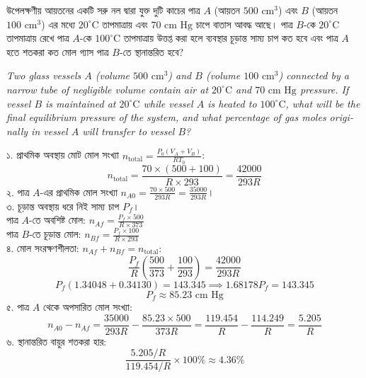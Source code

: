 \documentclass[12pt, a4paper]{article}
\begin{document}
\vspace{1.5em}

\begin{tcolorbox}[questionbox={প্রশ্ন (Question) 3}]
\noindent
উপেলক্ষণীয় আয়তনের একটি সরু নল দ্বারা যুক্ত দুটি কাচের পাত্র $A$ (আয়তন $500\text{ cm}^3$) এবং $B$ (আয়তন $100\text{ cm}^3$) এর মধ্যে $20^\circ\text{C}$ তাপমাত্রায় এবং $70\text{ cm Hg}$ চাপে বাতাস আবদ্ধ আছে। পাত্র $B$-কে $20^\circ\text{C}$ তাপমাত্রায় রেখে পাত্র $A$-কে $100^\circ\text{C}$ তাপমাত্রায় উত্তপ্ত করা হলে ব্যবস্থার চূড়ান্ত সাম্য চাপ কত হবে এবং পাত্র $A$ হতে শতকরা কত মোল গ্যাস পাত্র $B$-তে স্থানান্তরিত হবে?

\vspace{0.8em}
\begin{english}
\noindent\textit{\color{darkgray}
Two glass vessels $A$ (volume $500\text{ cm}^3$) and $B$ (volume $100\text{ cm}^3$) connected by a narrow tube of negligible volume contain air at $20^\circ\text{C}$ and $70\text{ cm Hg}$ pressure. If vessel $B$ is maintained at $20^\circ\text{C}$ while vessel $A$ is heated to $100^\circ\text{C}$, what will be the final equilibrium pressure of the system, and what percentage of gas moles originally in vessel $A$ will transfer to vessel $B$?
}
\end{english}
\end{tcolorbox}

\vspace{1em}

\begin{tcolorbox}[solutionbox={সমাধান (Solution)}]
\noindent
১. প্রাথমিক অবস্থায় মোট মোল সংখ্যা $n_{\text{total}} = \frac{P_0 (V_A + V_B)}{R T_0}$:
\[ n_{\text{total}} = \frac{70 \times (500 + 100)}{R \times 293} = \frac{42000}{293 R} \]
২. পাত্র $A$-এর প্রাথমিক মোল সংখ্যা $n_{A0} = \frac{70 \times 500}{293 R} = \frac{35000}{293 R}$। \\
৩. চূড়ান্ত অবস্থায় ধরে নিই সাম্য চাপ $P_f$। \\
পাত্র $A$-তে অবশিষ্ট মোল: $n_{Af} = \frac{P_f \times 500}{R \times 373}$ \\
পাত্র $B$-তে চূড়ান্ত মোল: $n_{Bf} = \frac{P_f \times 100}{R \times 293}$ \\
৪. মোল সংরক্ষণশীলতা: $n_{Af} + n_{Bf} = n_{\text{total}}$:
\[ \frac{P_f}{R} \left(\frac{500}{373} + \frac{100}{293}\right) = \frac{42000}{293 R} \]
\[ P_f (1.34048 + 0.34130) = 143.345 \implies 1.68178 P_f = 143.345 \]
\[ P_f \approx 85.23\text{ cm Hg} \]
৫. পাত্র $A$ থেকে অপসারিত মোল সংখ্যা:
\[ n_{A0} - n_{Af} = \frac{35000}{293 R} - \frac{85.23 \times 500}{373 R} = \frac{119.454}{R} - \frac{114.249}{R} = \frac{5.205}{R} \]
৬. স্থানান্তরিত বায়ুর শতকরা হার:
\[ \frac{5.205 / R}{119.454 / R} \times 100\% \approx 4.36\% \]
\end{tcolorbox}
\end{document}

